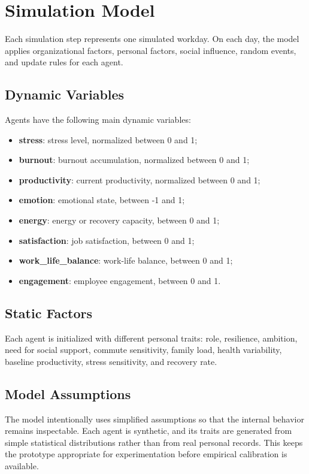 \documentclass[12pt,a4paper]{article}
\begin{document}
\section{Simulation Model}

Each simulation step represents one simulated workday. On each day, the model applies organizational factors, personal factors, social influence, random events, and update rules for each agent.

\subsection{Dynamic Variables}

Agents have the following main dynamic variables:

\begin{itemize}
    \item \textbf{stress}: stress level, normalized between 0 and 1;
    \item \textbf{burnout}: burnout accumulation, normalized between 0 and 1;
    \item \textbf{productivity}: current productivity, normalized between 0 and 1;
    \item \textbf{emotion}: emotional state, between -1 and 1;
    \item \textbf{energy}: energy or recovery capacity, between 0 and 1;
    \item \textbf{satisfaction}: job satisfaction, between 0 and 1;
    \item \textbf{work\_life\_balance}: work-life balance, between 0 and 1;
    \item \textbf{engagement}: employee engagement, between 0 and 1.
\end{itemize}

\subsection{Static Factors}

Each agent is initialized with different personal traits: role, resilience, ambition, need for social support, commute sensitivity, family load, health variability, baseline productivity, stress sensitivity, and recovery rate.

\subsection{Model Assumptions}

The model intentionally uses simplified assumptions so that the internal behavior remains inspectable. Each agent is synthetic, and its traits are generated from simple statistical distributions rather than from real personal records. This keeps the prototype appropriate for experimentation before empirical calibration is available.
\end{document}
